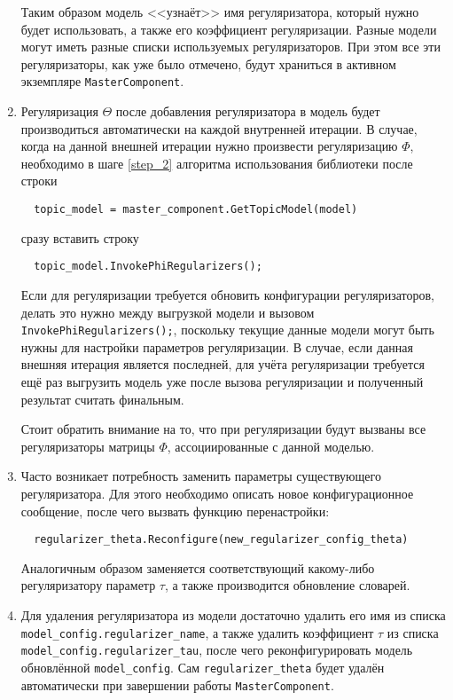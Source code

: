 \begin{enumerate}
	Таким образом модель <<узнаёт>> имя регуляризатора, который нужно будет использовать, а также его коэффициент регуляризации. Разные модели могут иметь разные списки используемых регуляризаторов. При этом все эти регуляризаторы, как уже было отмечено, будут храниться в активном экземпляре \verb|MasterComponent|.
	
	\item Регуляризация $\Theta$ после добавления регуляризатора в модель будет производиться автоматически на каждой внутренней итерации. В случае, когда на данной внешней итерации нужно произвести регуляризацию $\Phi$, необходимо в шаге \ref{step_2} алгоритма использования библиотеки после строки
	
	\vspace{4pt}	
	\verb|  topic_model = master_component.GetTopicModel(model)|
	\vspace{4pt}	
	
	сразу вставить строку 
	
	\vspace{4pt}	
	\verb|  topic_model.InvokePhiRegularizers();|
	\vspace{4pt}		
	
	Если для регуляризации требуется обновить конфигурации регуляризаторов, делать это нужно между выгрузкой модели и вызовом \verb|InvokePhiRegularizers();|, поскольку текущие данные модели могут быть нужны для настройки параметров регуляризации. В случае, если данная внешняя итерация является последней, для учёта регуляризации требуется ещё раз выгрузить модель уже после вызова регуляризации и полученный результат считать финальным.
	
	Стоит обратить внимание на то, что при регуляризации будут вызваны все регуляризаторы матрицы $\Phi$, ассоциированные с данной моделью.
	
	\item Часто возникает потребность заменить параметры существующего регуляризатора. Для этого необходимо описать новое конфигурационное сообщение, после чего вызвать функцию перенастройки:
	
	\vspace{4pt}	
	\verb|  regularizer_theta.Reconfigure(new_regularizer_config_theta)|
	\vspace{4pt}
	
	Аналогичным образом заменяется соответствующий какому-либо регуляризатору параметр $\tau$, а также производится обновление словарей.
	
	\item Для удаления регуляризатора из модели достаточно удалить его имя из списка \verb|model_config.regularizer_name|, а также удалить коэффициент $\tau$ из списка \verb|model_config.regularizer_tau|, после чего реконфигурировать модель обновлённой \verb|model_config|. Сам \verb|regularizer_theta| будет удалён автоматически при завершении работы \verb|MasterComponent|.
	
\end{enumerate}

